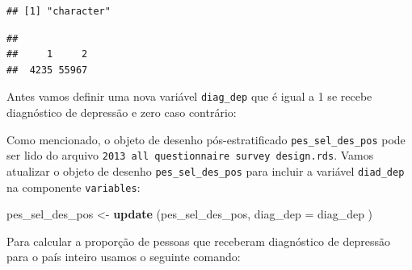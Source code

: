 \documentclass[]{book}
\newenvironment{Shaded}{\begin{snugshade}}{\end{snugshade}}
\newcommand{\KeywordTok}[1]{\textcolor[rgb]{0.13,0.29,0.53}{\textbf{{#1}}}}
\newcommand{\DataTypeTok}[1]{\textcolor[rgb]{0.13,0.29,0.53}{{#1}}}
\newcommand{\DecValTok}[1]{\textcolor[rgb]{0.00,0.00,0.81}{{#1}}}
\newcommand{\StringTok}[1]{\textcolor[rgb]{0.31,0.60,0.02}{{#1}}}
\newcommand{\CommentTok}[1]{\textcolor[rgb]{0.56,0.35,0.01}{\textit{{#1}}}}
\newcommand{\NormalTok}[1]{{#1}}
\numberwithin{example}{chapter}
\numberwithin{remark}{chapter}
\numberwithin{definition}{chapter}
\begin{document}
\begin{verbatim}
## [1] "character"
\end{verbatim}

\begin{Shaded}
\end{Shaded}

\begin{verbatim}
## 
##     1     2 
##  4235 55967
\end{verbatim}

Antes vamos definir uma nova variável \texttt{diag\_dep} que é igual a 1
se recebe diagnóstico de depressão e zero caso contrário:

\begin{Shaded}
\end{Shaded}

Como mencionado, o objeto de desenho pós-estratificado
\texttt{pes\_sel\_des\_pos} pode ser lido do arquivo
\texttt{2013\ all\ questionnaire\ survey\ design.rds}. Vamos atualizar o
objeto de desenho \texttt{pes\_sel\_des\_pos} para incluir a variável
\texttt{diad\_dep} na componente \texttt{variables}:

\begin{Shaded}
\begin{Highlighting}[]
\NormalTok{pes_sel_des_pos <-}\StringTok{ }\KeywordTok{update} \NormalTok{(pes_sel_des_pos, }\DataTypeTok{diag_dep =} \NormalTok{diag_dep )}
\end{Highlighting}
\end{Shaded}

Para calcular a proporção de pessoas que receberam diagnóstico de
depressão para o país inteiro usamos o seguinte comando:

\begin{Shaded}
\end{Shaded}
\end{document}

